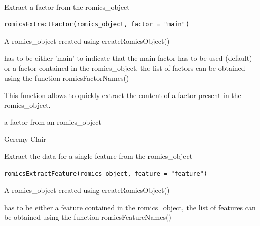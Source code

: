 \documentclass[a4paper]{book}
\begin{document}
%
\begin{Description}
Extract a factor from the romics\_object
\end{Description}
%
\begin{Usage}
\begin{verbatim}
romicsExtractFactor(romics_object, factor = "main")
\end{verbatim}
\end{Usage}
%
\begin{Arguments}
\begin{ldescription}
\item[\code{romics\_object}] A romics\_object created using createRomicsObject()

\item[\code{factor}] has to be either 'main' to indicate that the main factor has to be used (default) or a factor contained in the romics\_object, the list of factors can be obtained using the function romicsFactorNames()
\end{ldescription}
\end{Arguments}
%
\begin{Details}
This function allows to quickly extract the content of a factor present in the romics\_object.
\end{Details}
%
\begin{Value}
a factor from an romics\_object
\end{Value}
%
\begin{Author}
Geremy Clair
\end{Author}
%
\begin{Description}
Extract the data for a single feature from the romics\_object
\end{Description}
%
\begin{Usage}
\begin{verbatim}
romicsExtractFeature(romics_object, feature = "feature")
\end{verbatim}
\end{Usage}
%
\begin{Arguments}
\begin{ldescription}
\item[\code{romics\_object}] A romics\_object created using createRomicsObject()

\item[\code{feature}] has to be either a feature contained in the romics\_object, the list of features can be obtained using the function romicsFeatureNames()
\end{ldescription}
\end{Arguments}
\end{document}
